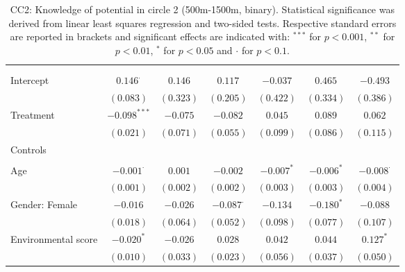 \begin{center}
\begin{small}
\begin{longtable}{l@{} c@{} c@{} c@{} c@{} c@{} c@{}}
\hline
\endhead
\hline
\endfoot
\hline
\multicolumn{7}{l}{\tiny{
}}\\
\caption{CC2: Knowledge of potential in circle 2 (500m-1500m, binary). Statistical significance was derived from linear least squares regression and two-sided tests. Respective standard errors are reported in brackets and significant effects are indicated with: $^{***}$ for $p < 0.001$, $^{**}$ for $p < 0.01$, $^*$ for $p < 0.05$ and $\cdot$ for $p < 0.1$.}
\label{table:coefficients}
\endlastfoot \\
Intercept                           & $0.146^{\cdot}$  & $0.146$     & $0.117$          & $-0.037$     & $0.465$       & $-0.493$         \\
                                    & $(0.083)$        & $(0.323)$   & $(0.205)$        & $(0.422)$    & $(0.334)$     & $(0.386)$        \\
Treatment                           & $-0.098^{***}$   & $-0.075$    & $-0.082$         & $0.045$      & $0.089$       & $0.062$          \\
                                    & $(0.021)$        & $(0.071)$   & $(0.055)$        & $(0.099)$    & $(0.086)$     & $(0.115)$        \\
Controls                            &                  &             &                  &              &               &                  \\
                                    &                  &             &                  &              &               &                  \\
\quad Age                           & $-0.001^{\cdot}$ & $0.001$     & $-0.002$         & $-0.007^{*}$ & $-0.006^{*}$  & $-0.008^{\cdot}$ \\
                                    & $(0.001)$        & $(0.002)$   & $(0.002)$        & $(0.003)$    & $(0.003)$     & $(0.004)$        \\
\quad Gender: Female                & $-0.016$         & $-0.026$    & $-0.087^{\cdot}$ & $-0.134$     & $-0.180^{*}$  & $-0.088$         \\
                                    & $(0.018)$        & $(0.064)$   & $(0.052)$        & $(0.098)$    & $(0.077)$     & $(0.107)$        \\
\quad Environmental score           & $-0.020^{*}$     & $-0.026$    & $0.028$          & $0.042$      & $0.044$       & $0.127^{*}$      \\
                                    & $(0.010)$        & $(0.033)$   & $(0.023)$        & $(0.056)$    & $(0.037)$     & $(0.050)$        \\

\end{longtable}
\end{small}
\end{center}
